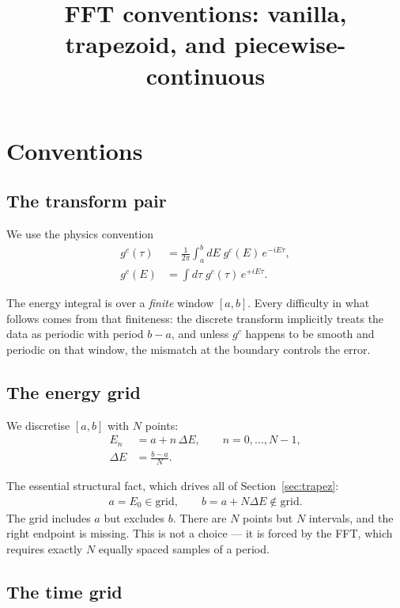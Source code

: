 \documentclass{article}
\title{FFT conventions: vanilla, trapezoid, and piecewise-continuous}
\author{}
\date{}
\begin{document}
	\maketitle
	
	\section{Conventions}
	
	\subsection{The transform pair}
	
	We use the physics convention
	\begin{align}
		g^{c}(\tau) &= \frac{1}{2\pi}\int_a^b dE\; g^c(E)\, e^{-iE\tau}, \\
		g^{c}(E)    &= \int d\tau\; g^c(\tau)\, e^{+iE\tau}.
	\end{align}
	
	The energy integral is over a \emph{finite} window $[a,b]$. Every difficulty in
	what follows comes from that finiteness: the discrete transform implicitly
	treats the data as periodic with period $b-a$, and unless $g^c$ happens to be
	smooth and periodic on that window, the mismatch at the boundary controls the
	error.
	
	\subsection{The energy grid}
	
	We discretise $[a,b]$ with $N$ points:
	\begin{align}
		E_n &= a + n\,\Delta E, \qquad n = 0,\dots,N-1, \\
		\Delta E &= \frac{b-a}{N}.
	\end{align}
	
	The essential structural fact, which drives all of Section~\ref{sec:trapez}:
	\begin{align}
		\boxed{\;a = E_0 \in \text{grid}, \qquad b = a + N\Delta E \notin \text{grid}.\;}
	\end{align}
	The grid includes $a$ but excludes $b$. There are $N$ points but $N$ intervals, and the
	right endpoint is missing. This is not a choice --- it is forced by the FFT,
	which requires exactly $N$ equally spaced samples of a period.
	
	\subsection{The time grid}
	
\end{document}
